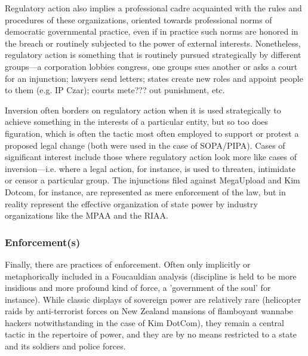 \documentclass[10pt,letter,oneside]{scrartcl}
\begin{document}
Regulatory action also implies a professional cadre acquainted with the rules
and procedures of these organizations, oriented towards professional norms of
democratic governmental practice, even if in practice such norms are honored in
the breach or routinely subjected to the power of external interests.
Nonetheless, regulatory action is something that is routinely pursued
strategically by different groups---a corporation lobbies congress, one groups
sues another or asks a court for an injunction; lawyers send letters; states
create new roles and appoint people to them (e.g. IP Czar); courts mete??? out
punishment, etc.

Inversion often borders on regulatory action when it is used strategically to
achieve something in the interests of a particular entity, but so too does
figuration, which is often the tactic most often employed to support or protest
a proposed legal change (both were used in the case of SOPA/PIPA).  Cases of
significant interest include those where regulatory action look more like cases
of inversion---i.e. where a legal action, for instance, is used to threaten,
intimidate or censor a particular group. The injunctions filed against
MegaUpload and Kim Dotcom, for instance, are represented as mere enforcement of
the law, but in reality represent the effective organization of state power by
industry organizations like the MPAA and the RIAA.

\subsubsection{Enforcement(s)}

Finally, there are practices of enforcement. Often only implicitly or
metaphorically included in a Foucauldian analysis (discipline is held to be
more insidious and more profound kind of force, a 'government of the soul' for
instance).  While classic displays of sovereign power are relatively rare
(helicopter raids by anti-terrorist forces on New Zealand mansions of
flamboyant wannabe hackers notwithstanding in the case of Kim DotCom), they
remain a central tactic in the repertoire of power, and they are by no means
restricted to a state and its soldiers and police forces. 
\end{document}
